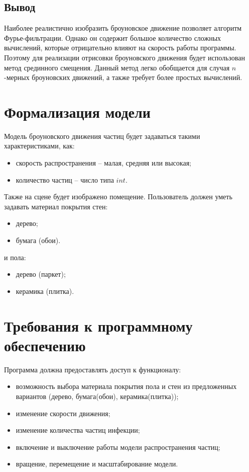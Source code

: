\subsection*{Вывод}

Наиболее реалистично изобразить броуновское движение позволяет алгоритм Фурье-фильтрации. Однако он содержит большое количество сложных вычислений, которые отрицательно влияют на скорость работы программы. Поэтому для реализации отрисовки броуновского движения будет использован метод срединного смещения. Данный метод легко обобщается для случая $n$-мерных броуновских движений, а также требует более простых вычислений.

\section{Формализация модели}
Модель броуновского движения частиц будет задаваться такими характеристиками, как:
\begin{itemize} 
	\item скорость распространения -- малая, средняя или высокая;
	\item количество частиц -- число типа $int$.
\end{itemize}

Также на сцене будет изображено помещение. Пользователь должен уметь задавать материал покрытия стен:
\begin{itemize} 
	\item дерево;
	\item бумага (обои).
\end{itemize}
и пола:
\begin{itemize} 
	\item дерево (паркет);
	\item керамика (плитка).
\end{itemize}


\section{Требования к программному обеспечению}

Программа должна предоставлять доступ к функционалу:

\begin{itemize}
    \item возможность выбора материала покрытия пола и стен из предложенных вариантов (дерево, бумага(обои), керамика(плитка));
    \item изменение скорости движения;
    \item изменение количества частиц инфекции;
    \item включение и выключение работы модели распространения частиц;
    \item вращение, перемещение и масштабирование модели.
\end{itemize}


